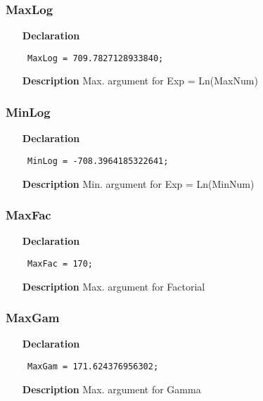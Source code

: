 \documentclass[12pt,a4paper,oneside]{report}
\newcommand{\declarationitem}[1]{\textbf{#1}}
\newcommand{\descriptiontitle}[1]{\textbf{#1}}
\newcommand{\code}[1]{\texttt{#1}}
\begin{document}
\subsubsection{MaxLog}
\label{utypes-MaxLog}
\begin{itemize}\item[\declarationitem{Declaration}\hfill]
	\begin{flushleft}
		\code{
			MaxLog   = 709.7827128933840;}
		
	\end{flushleft}
\item[\descriptiontitle{Description}]
Max. argument for Exp = Ln(MaxNum)	
\end{itemize}
\subsubsection{MinLog}
\label{utypes-}
\begin{itemize}\item[\declarationitem{Declaration}\hfill]
	\begin{flushleft}
		\code{
			MinLog   = -708.3964185322641;}
	\end{flushleft}
\item[\descriptiontitle{Description}]
Min. argument for Exp = Ln(MinNum)	
\end{itemize}
\subsubsection{MaxFac}
\label{utypes-MaxFac}
\begin{itemize}\item[\declarationitem{Declaration}\hfill]
	\begin{flushleft}
		\code{
			MaxFac   = 170;}
		
	\end{flushleft}
\item[\descriptiontitle{Description}]
Max. argument for Factorial	
\end{itemize}
\subsubsection{MaxGam}
\label{utypes-MaxGam}
\begin{itemize}\item[\declarationitem{Declaration}\hfill]
	\begin{flushleft}
		\code{
			MaxGam   = 171.624376956302;}
	\end{flushleft}
\item[\descriptiontitle{Description}]
Max. argument for Gamma	
\end{itemize}
\end{document}

